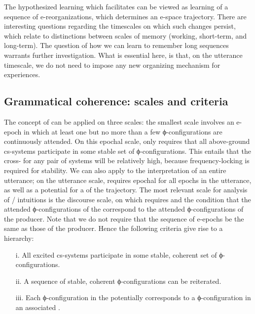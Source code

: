   The hypothesized learning which  facilitates can be viewed as learning of a sequence of e-reorganizations, which determines an e-space trajectory. There are interesting questions regarding the timescales on which such changes persist, which relate to distinctions between scales of memory (working, short-term, and long-term). The question of how we can learn to remember long sequences warrants further investigation. What is essential here, is that, on the utterance timescale, we do not need to impose any new organizing mechanism for  experiences. 

\subsection{Grammatical coherence: scales and criteria}

The concept of  can be applied on three scales: the smallest scale involves an e-epoch in which at least one but no more than a few ϕ-con\-fi\-gu\-ra\-tions are continuously attended. On this epochal scale,  only requires that all above-ground cs-sys\-tems participate in some stable set of ϕ-con\-fi\-gu\-ra\-tions. This entails that the cross- for any pair of systems will be relatively high, because frequency-locking is required for stability. We can also apply  to the interpretation of an entire utterance; on the utterance scale,  requires epochal  for all epochs in the utterance, as well as a potential for a  of the trajectory. The most relevant scale for analysis of / intuitions is the discourse scale, on which  requires  and the condition that the attended ϕ-con\-fi\-gu\-ra\-tions of the  correspond to the attended ϕ-con\-fi\-gu\-ra\-tions of the producer. Note that we do not require that the sequence of  e-epochs be the same as those of the producer. Hence the following criteria give rise to a  hierarchy:

\begin{itemize}
\item[i.] 
All excited cs-sys\-tems participate in some stable, coherent set of ϕ-con\-fi\-gu\-ra\-tions.
\item[ii.] 
A sequence of stable, coherent ϕ-con\-fi\-gu\-ra\-tions can be reiterated.
\item[iii.] 
Each ϕ-con\-fi\-gu\-ra\-tion in the potentially   corresponds to a ϕ-con\-fi\-gu\-ra\-tion in an associated .
\end{itemize}

